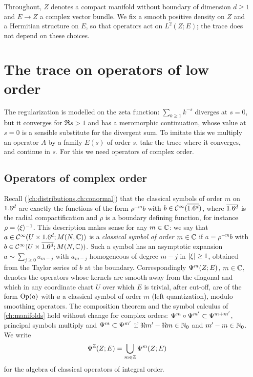 Throughout, $Z$ denotes a compact manifold without boundary of dimension $d\ge1$
and $E\longrightarrow Z$ a complex vector bundle. We fix a smooth positive density
on $Z$ and a Hermitian structure on $E$, so that operators act on $L^2(Z;E)$; the
trace does not depend on these choices.

\section{The trace on operators of low order}\label{eta:sec:trace}

The regularization is modelled on the zeta function: $\sum_{k\ge1}k^{-s}$ diverges
at $s=0$, but it converges for $\Re s>1$ and has a meromorphic continuation, whose
value at $s=0$ is a sensible substitute for the divergent sum. To imitate this we
multiply an operator $A$ by a family $E(s)$ of order $s$, take the trace where it
converges, and continue in $s$. For this we need operators of complex order.

\subsection{Operators of complex order} Recall (\cref{ch:distributions,ch:conormal})
that the classical symbols of order $m$ on $1.6^d$ are exactly the functions of the
form $\rho^{-m}b$ with $b\in\mathcal{C}^\infty(\overline{1.6^d})$, where $\overline{1.6^d}$ is the radial
compactification and $\rho$ is a boundary defining function, for instance
$\rho=\langle \xi\rangle^{-1}$. This description makes sense for any $m\in\mathbb{C}$: we say that
$a\in\mathcal{C}^\infty(U\times1.6^d;M(N,\mathbb{C}))$ is a \emph{classical symbol of order $m\in\mathbb{C}$} if
$a=\rho^{-m}b$ with $b\in\mathcal{C}^\infty(U\times\overline{1.6^d};M(N,\mathbb{C}))$. Such a symbol has an
asymptotic expansion $a\sim\sum_{j\ge0}a_{m-j}$ with $a_{m-j}$ homogeneous of degree
$m-j$ in $\lvert \xi\rvert\ge1$, obtained from the Taylor series of $b$ at the boundary.
Correspondingly $\Psi^{m}(Z;E)$, $m\in\mathbb{C}$, denotes the operators whose kernels are
smooth away from the diagonal and which in any coordinate chart $U$ over which $E$ is
trivial, after cut-off, are of the form $\operatorname{Op}(a)$ with $a$ a classical symbol of
order $m$ (left quantization), modulo smoothing operators. The composition theorem
and the symbol calculus of \cref{ch:manifolds} hold without change for complex
orders: $\Psi^{m}\circ\Psi^{m'}\subset\Psi^{m+m'}$, principal symbols multiply and
$\Psi^{m}\subset\Psi^{m'}$ if $\Re m'-\Re m\in\mathbb{N}_0$ and $m'-m\in\mathbb{N}_0$. We write
\[
\Psi^{\mathbb{Z}}(Z;E)=\bigcup_{m\in\mathbb{Z}}\Psi^{m}(Z;E)
\]
for the algebra of classical operators of integral order.


